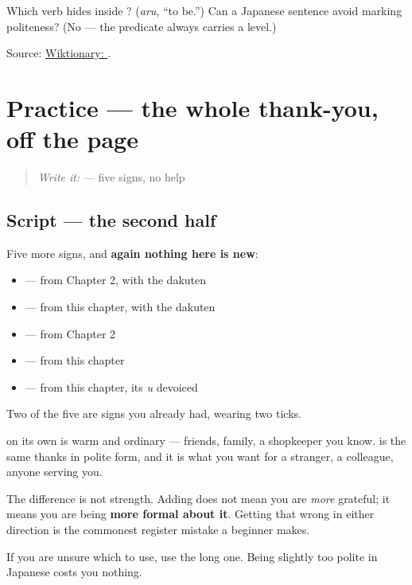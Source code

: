 \begin{tcolorbox}[breakable,colback=teal!4,colframe=teal!35!black,title={Before you move on}]
Which verb hides inside \textbf{}? (\emph{aru}, \textquotedblleft{}to be.\textquotedblright{}) Can a Japanese sentence avoid marking politeness? (No — the predicate always carries a level.)

Source: \href{https://en.wiktionary.org/wiki/\%E3\%81\%94\%E3\%81\%96\%E3\%81\%84\%E3\%81\%BE\%E3\%81\%99}{Wiktionary: }.
\end{tcolorbox}
\section[Practice]{Practice — the whole thank-you, off the page}

\label{lesson:JA-C03-practice}



\begin{quote}
\emph{Write it:}  — five signs, no help
\end{quote}

\subsection*{Script — the second half}
\begin{quote}
\end{quote}

Five more signs, and \textbf{again nothing here is new}:

\begin{itemize}
\raggedright
  \item \textbf{} —  from Chapter 2, with the dakuten
  \item \textbf{} —  from this chapter, with the dakuten
  \item \textbf{} — from Chapter 2
  \item \textbf{} — from this chapter
  \item \textbf{} — from this chapter, its \emph{u} devoiced
\end{itemize}

Two of the five are signs you already had, wearing two ticks.

\begin{culture}
\textbf{} on its own is warm and ordinary — friends, family, a shopkeeper you know. \textbf{} is the same thanks in polite form, and it is what you want for a stranger, a colleague, anyone serving you.

The difference is not strength. Adding  does not mean you are \emph{more} grateful; it means you are being \textbf{more formal about it}. Getting that wrong in either direction is the commonest register mistake a beginner makes.

If you are unsure which to use, use the long one. Being slightly too polite in Japanese costs you nothing.
\end{culture}

